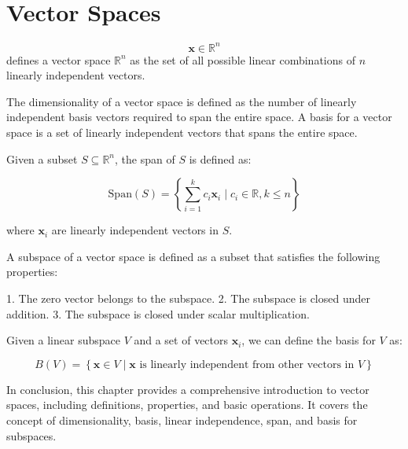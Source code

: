 \section{Vector Spaces}

\label{sec:vector-spaces}
\begin{equation}
\mathbf{x} \in \mathbb{R}^n
\end{equation}
defines a vector space $\mathbb{R}^n$ as the set of all possible linear combinations of $n$ linearly independent vectors.

The dimensionality of a vector space is defined as the number of linearly independent basis vectors required to span the entire space. A basis for a vector space is a set of linearly independent vectors that spans the entire space.

\label{def:span}
Given a subset $S \subseteq \mathbb{R}^n$, the span of $S$ is defined as:

$$
\text{Span}(S) = \left\{
\sum_{i=1}^{k} c_i \mathbf{x}_i \mid c_i \in \mathbb{R}, k \leq n
\right\}
$$

where $\mathbf{x}_i$ are linearly independent vectors in $S$.

A subspace of a vector space is defined as a subset that satisfies the following properties:

1. The zero vector belongs to the subspace.
2. The subspace is closed under addition.
3. The subspace is closed under scalar multiplication.

\label{def:subspace}
Given a linear subspace $V$ and a set of vectors $\mathbf{x}_i$, we can define the basis for $V$ as:

$$
B(V) = \left\{
\mathbf{x} \in V \mid \text{$\mathbf{x}$ is linearly independent from other vectors in $V$}
\right\}
$$

In conclusion, this chapter provides a comprehensive introduction to vector spaces, including definitions, properties, and basic operations. It covers the concept of dimensionality, basis, linear independence, span, and basis for subspaces.

\label{sec:vector-spaces-2}